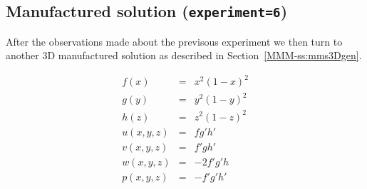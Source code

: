 \subsection*{Manufactured solution ({\tt experiment=6})}

After the observations made about the previsous experiment we then turn to 
another 3D manufactured solution as described in Section~\ref{MMM-ss:mms3Dgen}.

\begin{eqnarray}
f(x) &=& x^2(1-x)^2 \\
g(y) &=& y^2(1-y)^2 \\
h(z) &=& z^2(1-z)^2 \\
u(x,y,z) &=& fg'h' \\
v(x,y,z) &=& f'gh'  \\
w(x,y,z) &=& -2f'g'h \\
p(x,y,z) &=& -f'g'h'
\end{eqnarray}


